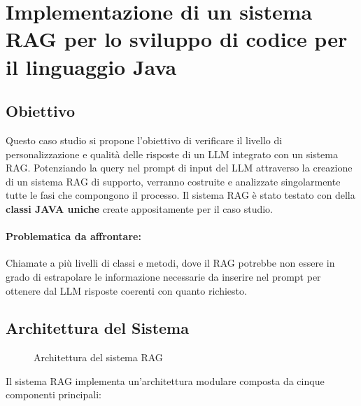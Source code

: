 \documentclass[12pt,a4paper,openright,twoside]{book}
\begin{document}
\chapter{Implementazione di un sistema RAG per lo sviluppo di codice per il linguaggio Java}
\section{Obiettivo}
Questo caso studio si propone l'obiettivo di verificare il livello di personalizzazione e qualità delle risposte di un LLM integrato con un sistema RAG.
Potenziando la query nel prompt di input del LLM attraverso la creazione di un sistema RAG di supporto,
verranno costruite e analizzate singolarmente tutte le fasi che compongono il processo.
Il sistema RAG è stato testato con della \textbf{classi JAVA uniche} create appositamente per il caso studio.
\subsubsection{Problematica da affrontare:}
Chiamate a più livelli di classi e metodi, dove il RAG potrebbe non essere in grado di estrapolare
le informazione necessarie da inserire nel prompt per ottenere dal LLM risposte coerenti con quanto richiesto.

\section{Architettura del Sistema}
\begin{figure}[H]
    \centering
    \caption{Architettura del sistema RAG}
    \label{fig:rag-architecture}
\end{figure}
Il sistema RAG implementa un'architettura modulare composta da cinque componenti principali:
\end{document}
